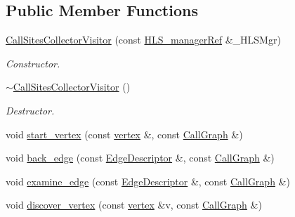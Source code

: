 \subsection*{Public Member Functions}
\begin{DoxyCompactItemize}
\item 
\hyperlink{classCallSitesCollectorVisitor_af0464f236c4fb81f79fe157d31e30116}{Call\+Sites\+Collector\+Visitor} (const \hyperlink{hls__manager_8hpp_acd3842b8589fe52c08fc0b2fcc813bfe}{H\+L\+S\+\_\+manager\+Ref} \&\+\_\+\+H\+L\+S\+Mgr)
\begin{DoxyCompactList}\small\item\em Constructor. \end{DoxyCompactList}\item 
\hyperlink{classCallSitesCollectorVisitor_a93aae645aa234551c112786f96bcabfb}{$\sim$\+Call\+Sites\+Collector\+Visitor} ()
\begin{DoxyCompactList}\small\item\em Destructor. \end{DoxyCompactList}\item 
void \hyperlink{classCallSitesCollectorVisitor_a8acc3ce8e9df345ac06d6afc776047f1}{start\+\_\+vertex} (const \hyperlink{graph_8hpp_abefdcf0544e601805af44eca032cca14}{vertex} \&, const \hyperlink{classCallGraph}{Call\+Graph} \&)
\item 
void \hyperlink{classCallSitesCollectorVisitor_a9a9f3e4c7614f9dee1db7f949cc2dbb9}{back\+\_\+edge} (const \hyperlink{graph_8hpp_a9eb9afea34e09f484b21f2efd263dd48}{Edge\+Descriptor} \&, const \hyperlink{classCallGraph}{Call\+Graph} \&)
\item 
void \hyperlink{classCallSitesCollectorVisitor_aed0f4e539fe2c7d2af41e77ec74757d4}{examine\+\_\+edge} (const \hyperlink{graph_8hpp_a9eb9afea34e09f484b21f2efd263dd48}{Edge\+Descriptor} \&, const \hyperlink{classCallGraph}{Call\+Graph} \&)
\item 
void \hyperlink{classCallSitesCollectorVisitor_a0385b9d39f5930eaf55ce2e137ad1864}{discover\+\_\+vertex} (const \hyperlink{graph_8hpp_abefdcf0544e601805af44eca032cca14}{vertex} \&v, const \hyperlink{classCallGraph}{Call\+Graph} \&)
\end{DoxyCompactItemize}
